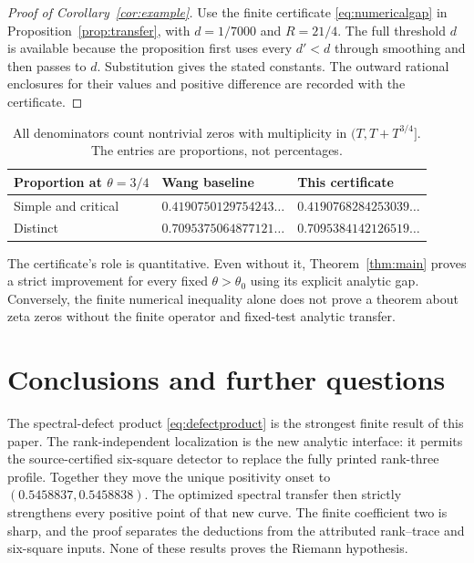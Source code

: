 ﻿\documentclass[11pt]{article}
\theoremstyle{remark}
\begin{document}
\begin{proof}[Proof of Corollary~\ref{cor:example}]
Use the finite certificate \eqref{eq:numericalgap} in
Proposition~\ref{prop:transfer}, with $d=1/7000$ and $R=21/4$.
The full threshold $d$ is available because the proposition first uses
every $d'<d$ through smoothing and then passes to $d$. Substitution
gives the stated constants. The outward rational enclosures for their
values and positive difference are recorded with the certificate.
\end{proof}

\begin{table}[ht]
\centering
\begin{tabular}{@{}lll@{}}
\toprule
Proportion at $\theta=3/4$ & Wang baseline & This certificate\\
\midrule
Simple and critical & $0.4190750129754243\ldots$ & $0.4190768284253039\ldots$\\
Distinct & $0.7095375064877121\ldots$ & $0.7095384142126519\ldots$\\
\bottomrule
\end{tabular}
\caption{All denominators count nontrivial zeros with multiplicity in
$(T,T+T^{3/4}]$. The entries are proportions, not percentages.}
\end{table}

The certificate's role is quantitative. Even without it,
Theorem~\ref{thm:main} proves a strict improvement for every fixed
$\theta>\theta_0$ using its explicit analytic gap. Conversely, the
finite numerical inequality alone does not prove a theorem about zeta
zeros without the finite operator and fixed-test analytic transfer.

\section{Conclusions and further questions}

The spectral-defect product \eqref{eq:defectproduct} is the strongest finite
result of this paper. The rank-independent localization is the new analytic
interface: it permits the source-certified six-square detector to replace the
fully printed rank-three profile. Together they move the unique positivity
onset to $(0.5458837,0.5458838)$. The optimized spectral transfer then strictly
strengthens every positive point of that new curve. The finite coefficient two
is sharp, and the proof separates the deductions from the attributed
rank--trace and six-square inputs. None of these results proves the Riemann
hypothesis.
\end{document}
